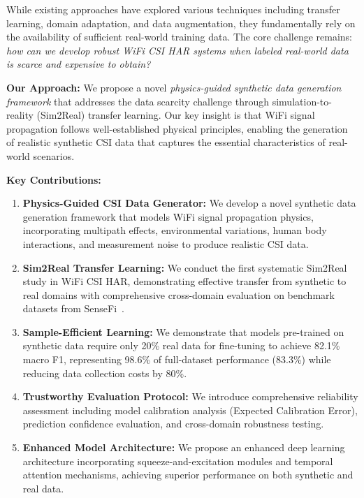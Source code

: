 \documentclass[journal]{IEEEtran}
\begin{document}
While existing approaches have explored various techniques including transfer learning, domain adaptation, and data augmentation, they fundamentally rely on the availability of sufficient real-world training data. The core challenge remains: \textit{how can we develop robust WiFi CSI HAR systems when labeled real-world data is scarce and expensive to obtain?}

\textbf{Our Approach:} We propose a novel \textit{physics-guided synthetic data generation framework} that addresses the data scarcity challenge through simulation-to-reality (Sim2Real) transfer learning. Our key insight is that WiFi signal propagation follows well-established physical principles, enabling the generation of realistic synthetic CSI data that captures the essential characteristics of real-world scenarios.

\textbf{Key Contributions:}
\begin{enumerate}
\item \textbf{Physics-Guided CSI Data Generator:} We develop a novel synthetic data generation framework that models WiFi signal propagation physics, incorporating multipath effects, environmental variations, human body interactions, and measurement noise to produce realistic CSI data.

\item \textbf{Sim2Real Transfer Learning:} We conduct the first systematic Sim2Real study in WiFi CSI HAR, demonstrating effective transfer from synthetic to real domains with comprehensive cross-domain evaluation on benchmark datasets from SenseFi~\cite{yang2023sensefi}.

\item \textbf{Sample-Efficient Learning:} We demonstrate that models pre-trained on synthetic data require only 20\% real data for fine-tuning to achieve 82.1\% macro F1, representing 98.6\% of full-dataset performance (83.3\%) while reducing data collection costs by 80\%.

\item \textbf{Trustworthy Evaluation Protocol:} We introduce comprehensive reliability assessment including model calibration analysis (Expected Calibration Error), prediction confidence evaluation, and cross-domain robustness testing.

\item \textbf{Enhanced Model Architecture:} We propose an enhanced deep learning architecture incorporating squeeze-and-excitation modules and temporal attention mechanisms, achieving superior performance on both synthetic and real data.
\end{enumerate}
\end{document}
